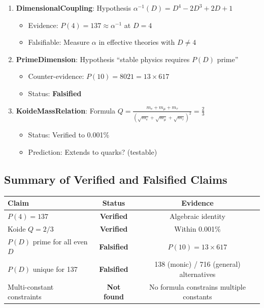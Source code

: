 \documentclass[11pt,a4paper]{article}
\begin{document}
\begin{enumerate}
    \item \textbf{DimensionalCoupling}: Hypothesis $\alpha^{-1}(D) = D^4 - 2D^3 + 2D + 1$
    \begin{itemize}
        \item Evidence: $P(4) = 137 \approx \alpha^{-1}$ at $D = 4$
        \item Falsifiable: Measure $\alpha$ in effective theories with $D \neq 4$
    \end{itemize}
    
    \item \textbf{PrimeDimension}: Hypothesis ``stable physics requires $P(D)$ prime''
    \begin{itemize}
        \item Counter-evidence: $P(10) = 8021 = 13 \times 617$
        \item Status: \textbf{Falsified}
    \end{itemize}
    
    \item \textbf{KoideMassRelation}: Formula $Q = \frac{m_e + m_\mu + m_\tau}{(\sqrt{m_e} + \sqrt{m_\mu} + \sqrt{m_\tau})^2} = \frac{2}{3}$
    \begin{itemize}
        \item Status: Verified to 0.001\%
        \item Prediction: Extends to quarks? (testable)
    \end{itemize}
\end{enumerate}

\subsection{Summary of Verified and Falsified Claims}

\begin{center}
\begin{tabular}{lcc}
\hline
Claim & Status & Evidence \\
\hline
$P(4) = 137$ & \textbf{Verified} & Algebraic identity \\
Koide $Q = 2/3$ & \textbf{Verified} & Within 0.001\% \\
$P(D)$ prime for all even $D$ & \textbf{Falsified} & $P(10) = 13 \times 617$ \\
$P(D)$ unique for 137 & \textbf{Falsified} & 138 (monic) / 716 (general) alternatives \\
Multi-constant constraints & \textbf{Not found} & No formula constrains multiple constants \\
\hline
\end{tabular}
\end{center}
\end{document}
